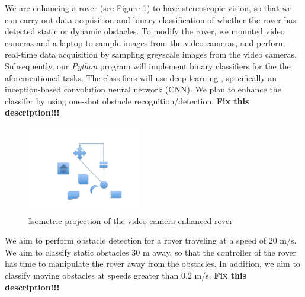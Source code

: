 \documentclass[letter,12pt]{article}
\begin{document}
We are enhancing a rover (see Figure \ref{fig:Isometricprojectionofthevideocameraenhancedrover}) to have stereoscopic vision, so that we can carry out data acquisition and binary classification of whether the rover has detected static or dynamic obstacles. To modify the rover, we mounted video cameras and a laptop to sample images from the video cameras, and perform real-time data acquisition by sampling greyscale images from the video cameras. Subsequently, our {\it Python} program will implement binary classifiers for the the aforementioned tasks. The classifiers will use deep learning \cite{Buduma2017,Ketkar2017,Pattanayak2017,Goodfellow2016,Wang2016,Bengio2015,Cho2014,Goodfellow2014}, specifically an inception-based convolution neural network (CNN). We plan to enhance the classifer by using one-shot obstacle recognition/detection. {\Huge \bf Fix this description!!!}


\begin{figure}[h]
\centering 
\includegraphics[height=1.5in]{./pics/my_figure}
\caption{Isometric projection of the video camera-enhanced rover}
\label{fig:Isometricprojectionofthevideocameraenhancedrover}
\end{figure}


We aim to perform obstacle detection for a rover traveling at a speed of 20 m/s. We aim to classify static obstacles 30 m away, so that the controller of the rover has time to manipulate the rover away from the obstacles. In addition, we aim to classify moving obstacles at speeds greater than 0.2 m/s. {\Huge \bf Fix this description!!!}
\end{document}

